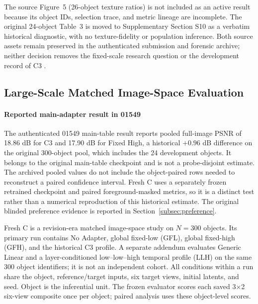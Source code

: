 \documentclass[times,twocolumn,final]{elsarticle}
\providecommand{\DIFadd}[1]{{\protect\color{blue} \sf #1}} %
\providecommand{\DIFaddbegin}{} %
\providecommand{\DIFaddend}{} %
\begin{document}
  \DIFaddbegin \DIFadd{The source Figure~5 (26-object texture ratios) is not included as an active result because its object IDs, selection trace, and metric lineage are incomplete. The original 24-object Table~3 is moved to Supplementary Section S10 as a verbatim historical diagnostic, with no texture-fidelity or population inference. Both source assets remain preserved in the authenticated submission and forensic archive; neither decision removes the fixed-scale research question or the development record of }\DIFaddend C3  \DIFaddbegin \DIFadd{.
}

\subsection{Large-Scale Matched Image-Space Evaluation}
\label{subsec:largescale}

\paragraph{Reported main-adapter result in 01549}
\DIFadd{The authenticated 01549 main-table result reports pooled full-image PSNR of 18.86 dB for }\DIFaddend C3   \DIFaddbegin \DIFadd{and 17.90 dB for Fixed High, a historical $+0.96$ dB difference on the original 300-object pool, which includes the 24 development objects. It belongs to the original main-table checkpoint and is not a probe-disjoint estimate. The archived pooled values do not include the object-paired rows needed to reconstruct a paired confidence interval. Fresh C uses a separately frozen retrained checkpoint and paired foreground-masked metrics, so it is a distinct test rather than a numerical reproduction of this historical estimate. The original blinded preference evidence is reported in Section~\ref{subsec:preference}.
}\DIFaddend 

  \DIFaddbegin \DIFadd{Fresh C is a revision-era matched image-space study on $N=300$ objects. Its primary run contains No Adapter, global fixed-low (GFL), global fixed-high (GFH), and the historical C3 profile. A separate addendum evaluates Generic Linear and a layer-conditioned low--low--high temporal profile (LLH) on the same 300 object identifiers; it is not an independent cohort. All conditions within a run share the object, reference/target inputs, six target views, initial latents, and seed. Object is the inferential unit. The frozen evaluator scores each saved 3$\times$2 six-view composite once per object; paired analysis uses these object-level scores.
}\DIFaddend 
\end{document}
